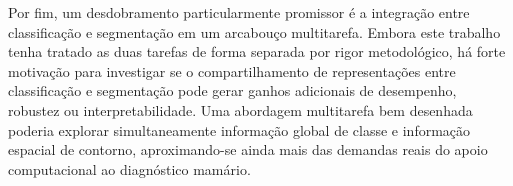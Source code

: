 \documentclass[tcc,capa]{texufpel}
\begin{document}
Por fim, um desdobramento particularmente promissor é a integração entre classificação e segmentação em um arcabouço multitarefa. Embora este trabalho tenha tratado as duas tarefas de forma separada por rigor metodológico, há forte motivação para investigar se o compartilhamento de representações entre classificação e segmentação pode gerar ganhos adicionais de desempenho, robustez ou interpretabilidade. Uma abordagem multitarefa bem desenhada poderia explorar simultaneamente informação global de classe e informação espacial de contorno, aproximando-se ainda mais das demandas reais do apoio computacional ao diagnóstico mamário. 



 

\end{document}
